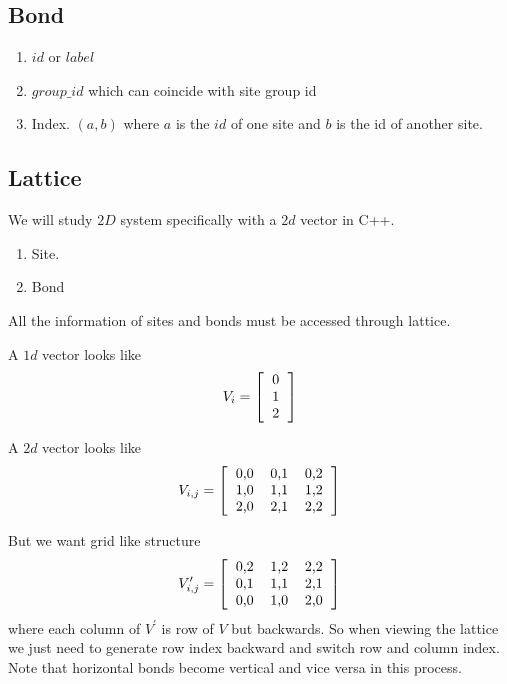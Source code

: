 	\subsection{Bond}
\begin{enumerate}
	\item $id$ or $label$
	\item $group\_id$ which can coincide with site group id
	
	\item Index. $(a,b)$ where $a$ is the $id$ of one site and $b$ is the id of another site.
\end{enumerate}
\newpage
	\subsection{Lattice}
	We will study $2D$ system specifically with a $2d$ vector in C++.
	\begin{enumerate}
		\item Site.
		\item Bond
	\end{enumerate}
 All the information of sites and bonds must be accessed through lattice.
	
	A $1d$ vector looks like
	\begin{equation*}
	V_i = 
	\left[
	\begin{tabular}{c}
		0 \\ 1 \\ 2
	\end{tabular}
	\right]
	\end{equation*}
	
		A $2d$ vector looks like
	\begin{equation*}
	V_{i,j} = 
	\left[
	\begin{tabular}{cccc}
	0,0 & 0,1 & 0,2 \\
	1,0 & 1,1 & 1,2 \\
	2,0 & 2,1 & 2,2
	\end{tabular}
	\right]
	\end{equation*}
	
	But we want grid like structure 
	\begin{equation*}
	V^\prime_{i,j} = 
	\left[
	\begin{tabular}{cccc}
	0,2 & 1,2 & 2,2 \\
	0,1 & 1,1 & 2,1 \\
	0,0 & 1,0 & 2,0
	\end{tabular}
	\right]
	\end{equation*}
	where each column of $V^\prime$ is row of $V$ but backwards. So when viewing the lattice we just need to generate row index backward and  switch row and column index. Note that horizontal bonds become vertical and vice versa in this process.

